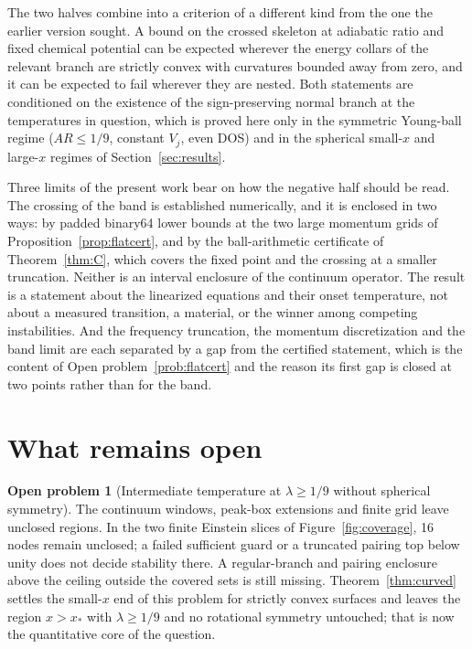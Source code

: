 \documentclass[11pt]{article}
\theoremstyle{definition}
\newtheorem{problem}[theorem]{Open problem}
\theoremstyle{remark}
\begin{document}
The two halves combine into a criterion of a different kind from the one the earlier version sought. A bound on the crossed skeleton at adiabatic ratio and fixed chemical potential can be expected wherever the energy collars of the relevant branch are strictly convex with curvatures bounded away from zero, and it can be expected to fail wherever they are nested. Both statements are conditioned on the existence of the sign-preserving normal branch at the temperatures in question, which is proved here only in the symmetric Young-ball regime ($AR\le1/9$, constant $V_j$, even DOS) and in the spherical small-$x$ and large-$x$ regimes of Section~\ref{sec:results}.

Three limits of the present work bear on how the negative half should be read. The crossing of the band is established numerically, and it is enclosed in two ways: by padded binary64 lower bounds at the two large momentum grids of Proposition~\ref{prop:flatcert}, and by the ball-arithmetic certificate of Theorem~\ref{thm:C}, which covers the fixed point and the crossing at a smaller truncation. Neither is an interval enclosure of the continuum operator. The result is a statement about the linearized equations and their onset temperature, not about a measured transition, a material, or the winner among competing instabilities. And the frequency truncation, the momentum discretization and the band limit are each separated by a gap from the certified statement, which is the content of Open problem~\ref{prob:flatcert} and the reason its first gap is closed at two points rather than for the band.

\section{What remains open}\label{sec:open}

\begin{problem}[Intermediate temperature at $\lambda\ge1/9$ without spherical symmetry]\label{prob:intermediate}
The continuum windows, peak-box extensions and finite grid leave unclosed regions. In the two finite Einstein slices of Figure~\ref{fig:coverage}, 16 nodes remain unclosed; a failed sufficient guard or a truncated pairing top below unity does not decide stability there. A regular-branch and pairing enclosure above the ceiling outside the covered sets is still missing. Theorem~\ref{thm:curved} settles the small-$x$ end of this problem for strictly convex surfaces and leaves the region $x>x_*$ with $\lambda\ge1/9$ and no rotational symmetry untouched; that is now the quantitative core of the question.
\end{problem}
\end{document}
